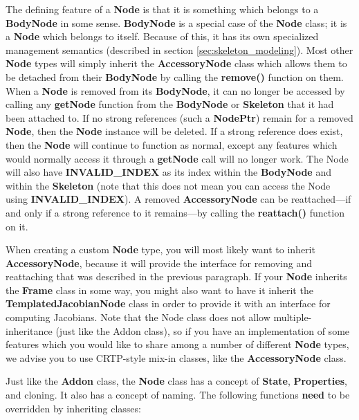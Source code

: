 The defining feature of a \textbf{Node} is that it is something which belongs to a \textbf{BodyNode} in some sense. \textbf{BodyNode} is a special case of the \textbf{Node} class; it is a \textbf{Node} which belongs to itself. Because of this, it has its own specialized management semantics (described in section \ref{sec:skeleton_modeling}). Most other \textbf{Node} types will simply inherit the \textbf{AccessoryNode} class which allows them to be detached from their \textbf{BodyNode} by calling the \textbf{remove()} function on them. When a \textbf{Node} is removed from its \textbf{BodyNode}, it can no longer be accessed by calling any \textbf{getNode} function from the \textbf{BodyNode} or \textbf{Skeleton} that it had been attached to. If no strong references (such a \textbf{NodePtr}) remain for a removed \textbf{Node}, then the \textbf{Node} instance will be deleted. If a strong reference does exist, then the \textbf{Node} will continue to function as normal, except any features which would normally access it through a \textbf{getNode} call will no longer work. The Node will also have \textbf{INVALID\_INDEX} as its index within the \textbf{BodyNode} and within the \textbf{Skeleton} (note that this does not mean you can access the Node using \textbf{INVALID\_INDEX}). A removed \textbf{AccessoryNode} can be reattached---if and only if a strong reference to it remains---by calling the \textbf{reattach()} function on it.

When creating a custom \textbf{Node} type, you will most likely want to inherit \textbf{AccessoryNode}, because it will provide the interface for removing and reattaching that was described in the previous paragraph. If your \textbf{Node} inherits the \textbf{Frame} class in some way, you might also want to have it inherit the \textbf{TemplatedJacobianNode} class in order to provide it with an interface for computing Jacobians. Note that the Node class does not allow multiple-inheritance (just like the Addon class), so if you have an implementation of some features which you would like to share among a number of different \textbf{Node} types, we advise you to use CRTP-style mix-in classes, like the \textbf{AccessoryNode} class.

Just like the \textbf{Addon} class, the \textbf{Node} class has a concept of \textbf{State}, \textbf{Properties}, and cloning. It also has a concept of naming. The following functions \textbf{need} to be overridden by inheriting classes:

